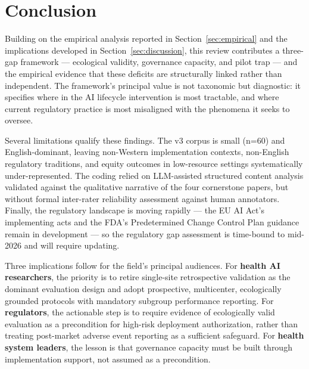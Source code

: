 
\section{Conclusion}
\label{sec:conclusion}

Building on the empirical analysis reported in Section~\ref{sec:empirical}
and the implications developed in Section~\ref{sec:discussion}, this review
contributes a three-gap framework --- ecological validity, governance
capacity, and pilot trap --- and the empirical evidence that these deficits
are structurally linked rather than independent. The framework's principal
value is not taxonomic but diagnostic: it specifies where in the AI
lifecycle intervention is most tractable, and where current regulatory
practice is most misaligned with the phenomena it seeks to oversee.

Several limitations qualify these findings. The v3 corpus is small (n=60)
and English-dominant, leaving non-Western implementation contexts,
non-English regulatory traditions, and equity outcomes in
low-resource settings systematically under-represented. The coding relied
on LLM-assisted structured content analysis validated against the
qualitative narrative of the four cornerstone papers, but without
formal inter-rater reliability assessment against human annotators.
Finally, the regulatory landscape is moving rapidly --- the EU AI
Act's implementing acts and the FDA's Predetermined Change Control Plan
guidance remain in development --- so the regulatory gap assessment is
time-bound to mid-2026 and will require updating.

Three implications follow for the field's principal audiences. For
\textbf{health AI researchers}, the priority is to retire single-site
retrospective validation as the dominant evaluation design and adopt
prospective, multicenter, ecologically grounded protocols with mandatory
subgroup performance reporting. For \textbf{regulators}, the actionable
step is to require evidence of ecologically valid evaluation as a
precondition for high-risk deployment authorization, rather than treating
post-market adverse event reporting as a sufficient safeguard. For
\textbf{health system leaders}, the lesson is that governance capacity
must be built through implementation support, not assumed as a
precondition.

